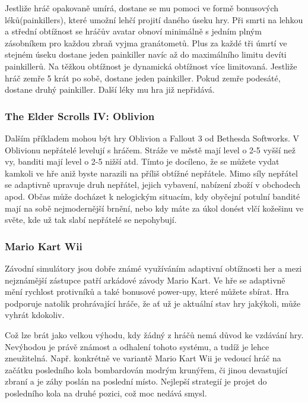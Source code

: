 Jestliže hráč opakovaně umírá, dostane se mu pomoci ve formě bonusových léků(painkillers), které umožní lehčí projití daného úseku hry. Při smrti na lehkou a střední obtížnost se hráčův avatar obnoví minimálně s jedním plným zásobníkem pro každou zbraň vyjma granátometů. Plus za každé tři úmrtí ve stejném úseku dostane jeden painkiller navíc až do maximálního limitu devíti painkillerů.
Na těžkou obtížnost je dynamická obtížnost více limitovaná. Jestliže hráč zemře 5 krát po sobě, dostane jeden painkiller. Pokud zemře podesáté, dostane druhý painkiller. Další léky mu hra již nepřidává. \cite{3}

\subsubsection{The Elder Scrolls IV: Oblivion}

Dalším příkladem mohou být hry Oblivion a Fallout 3 od Bethesda Softworks. V Oblivionu nepřátelé levelují s hráčem. Stráže ve městě mají level o 2-5 vyšší než vy, banditi mají level o 2-5 nižší atd. Tímto je docíleno, že se můžete vydat kamkoli ve hře aniž byste narazili na příliš obtížné nepřátele. Mimo síly nepřátel se adaptivně upravuje druh nepřátel, jejich vybavení, nabízení zboží v obchodech apod. Občas může docházet k nelogickým situacím, kdy obyčejní potulní bandité mají na sobě nejmodernější brnění, nebo kdy máte za úkol donést vlčí kožešinu ve světe, kde už tak slabí nepřátelé se nepohybují. \cite{4}

\subsubsection{Mario Kart Wii}

Závodní simulátory jsou dobře známé využíváním adaptivní obtížnosti her a mezi nejznámější zástupce patří arkádové závody Mario Kart. Ve hře se adaptivně mění rychlost protivníků a také bonusové power-upy, které můžete sbírat. Hra podporuje natolik prohrávající hráče, že ať už je aktuální stav hry jakýkoli, může vyhrát kdokoliv.

Což lze brát jako velkou výhodu, kdy žádný z hráčů nemá důvod ke vzdávání hry. Nevýhodou je právě známost a odhalení tohoto systému, a tudíž je lehce zneužitelná. Např. konkrétně ve variantě Mario Kart Wii je vedoucí hráč na začátku posledního kola bombardován modrým krunýřem, či jinou devastující zbraní a je záhy poslán na poslední místo. Nejlepší strategií je projet do posledního kola na druhé pozici, což moc nedává smysl. \cite{5}

